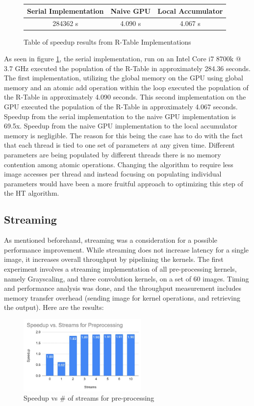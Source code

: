 \documentclass[12pt]{article}
\begin{document}
\begin{figure}
\begin{center}
\begin{tabular}{ |c|c|c| } 
 \hline
 Serial Implementation & Naive GPU & Local Accumulator \\ 
 \hline
 284362 s & 4.090 s & 4.067 s \\
 \hline
\end{tabular}\caption{Table of speedup results from R-Table Implementations}\label{table:histogramGeneration}
\end{center}
\end{figure}

As seen in figure \ref{table:histogramGeneration}, the serial implementation, run on an Intel Core i7 8700k @ 3.7 GHz executed the population of the R-Table in approximately 284.36 seconds.
The first implementation, utilizing the global memory on the GPU using global memory and an atomic add operation within the loop executed the population of the R-Table in approximately 4.090 seconds.
This second implementation on the GPU executed the population of the R-Table in approximately 4.067 seconds.
Speedup from the serial implementation to the naive GPU implementation is 69.5x.
Speedup from the naive GPU implementation to the local accumulator memory is negligible. 
The reason for this being the case has to do with the fact that each thread is tied to one set of parameters at any given time.
Different parameters are being populated by different threads there is no memory contention among atomic operations. 
Changing the algorithm to require less image accesses per thread and instead focusing on populating individual parameters would have been a more fruitful approach to optimizing this step of the HT algorithm.\label{section:histogramGeneration}

\subsection{Streaming}
As mentioned beforehand, streaming was a consideration for a possible performance improvement. While streaming does not increase latency for a single image, it increases overall throughput by pipelining the kernels. The first experiment involves a streaming implementation of all pre-processing kernels, namely Grayscaling, and three convolution kernels, on a set of 60 images. Timing and performance analysis was done, and the throughput measurement includes memory transfer overhead (sending image for kernel operations, and retrieving the output). Here are the results:
\begin{figure}
\centering
\includegraphics[width=2.5in]{figures/StreamingPreProcessing}\caption{Speedup vs \# of streams for pre-processing}\label{figure:streamPreProcess}
\end{figure}
\end{document}
